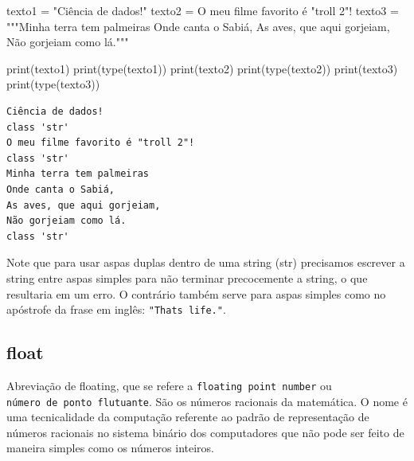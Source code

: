 \documentclass[
  letterpaper,
  DIV=11,
  numbers=noendperiod]{scrreprt}
\newenvironment{Shaded}{\begin{snugshade}}{\end{snugshade}}
\newcommand{\BuiltInTok}[1]{\textcolor[rgb]{0.00,0.23,0.31}{#1}}
\newcommand{\NormalTok}[1]{\textcolor[rgb]{0.00,0.23,0.31}{#1}}
\newcommand{\OperatorTok}[1]{\textcolor[rgb]{0.37,0.37,0.37}{#1}}
\newcommand{\StringTok}[1]{\textcolor[rgb]{0.13,0.47,0.30}{#1}}
\begin{document}
\begin{Shaded}
\begin{Highlighting}[]
\NormalTok{texto1 }\OperatorTok{=} \StringTok{"Ciência de dados!"}
\NormalTok{texto2 }\OperatorTok{=} \StringTok{\textquotesingle{}O meu filme favorito é "troll 2"!\textquotesingle{}}
\NormalTok{texto3 }\OperatorTok{=} \StringTok{"""Minha terra tem palmeiras}
\StringTok{Onde canta o Sabiá,}
\StringTok{As aves, que aqui gorjeiam,}
\StringTok{Não gorjeiam como lá."""}

\BuiltInTok{print}\NormalTok{(texto1)}
\BuiltInTok{print}\NormalTok{(}\BuiltInTok{type}\NormalTok{(texto1))}
\BuiltInTok{print}\NormalTok{(texto2)}
\BuiltInTok{print}\NormalTok{(}\BuiltInTok{type}\NormalTok{(texto2))}
\BuiltInTok{print}\NormalTok{(texto3)}
\BuiltInTok{print}\NormalTok{(}\BuiltInTok{type}\NormalTok{(texto3))}
\end{Highlighting}
\end{Shaded}

\begin{tcolorbox}[enhanced jigsaw, breakable, leftrule=.75mm, left=2mm, opacityback=0, bottomrule=.15mm, toprule=.15mm, rightrule=.15mm, arc=.35mm, colback=white]

\begin{verbatim}
Ciência de dados!
class 'str'
O meu filme favorito é "troll 2"!
class 'str'
Minha terra tem palmeiras
Onde canta o Sabiá,
As aves, que aqui gorjeiam,
Não gorjeiam como lá.
class 'str'
\end{verbatim}

\end{tcolorbox}

Note que para usar aspas duplas dentro de uma string (str) precisamos
escrever a string entre aspas simples para não terminar precocemente a
string, o que resultaria em um erro. O contrário também serve para aspas
simples como no apóstrofe da frase em inglês:
\texttt{"That\textquotesingle{}s\ life."}.

\hypertarget{float}{%
\subsection{float}\label{float}}

Abreviação de floating, que se refere a \texttt{floating\ point\ number}
ou \texttt{número\ de\ ponto\ flutuante}. São os números racionais da
matemática. O nome é uma tecnicalidade da computação referente ao padrão
de representação de números racionais no sistema binário dos
computadores que não pode ser feito de maneira simples como os números
inteiros.
\end{document}
